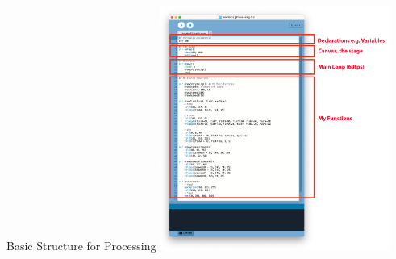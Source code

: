 \documentclass[10pt]{beamer}
\begin{document}

\begin{frame}{Basic Structure for Processing}
    	 \includegraphics[height=8cm]{images/process}
\end{frame}

\end{document}

